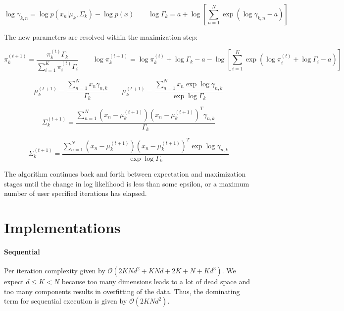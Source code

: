 \documentclass{article}
\newcommand{\boundedBy}[1]{\mathcal{O} \left ( #1 \right )}
\begin{document}
\begin{equation}
	\log \gamma_{k, n} =  \log p \left ( x_n \lvert \mu_k, \Sigma_k \right )  - \log p(x) \qquad \log \Gamma_k = a + \log \left [ \sum_{n=1}^{N} \exp{ \left( \log \gamma_{k, n} - a \right )} \right ]
\end{equation}

The new parameters are resolved within the maximization step:

\begin{equation}
	\pi_{k}^{(t+1)} = \frac{ \pi_{k}^{(t)} \Gamma_k }{ \sum_{i=1}^{K} \pi_{i}^{(t)} \Gamma_i }
	\qquad
	\log \pi_{k}^{(t+1)} = \log \pi_{k}^{(t)} + \log \Gamma_k - a - \log \left [ \sum_{i=1}^{K} \exp{ \left( \log \pi_{i}^{(t)} + \log \Gamma_i - a \right )} \right ]
\end{equation}

\begin{equation}
	\mu_k^{(t+1)} = \frac{ \sum_{n=1}^{N} x_n \gamma_{n, k} }{ \Gamma_k  }
	\qquad
	\mu_k^{(t+1)} = \frac{ \sum_{n=1}^{N} x_n \exp{ \log \gamma_{n, k} } }{ \exp{ \log \Gamma_k }  }
\end{equation}

\begin{equation}
	\Sigma_k^{(t+1)} = \frac{ \sum_{n=1}^{N} (x_n - \mu_k^{(t+1)}) (x_n - \mu_k^{(t+1)})^T \gamma_{n, k} }{ \Gamma_k  }
\end{equation}

\begin{equation}
	\Sigma_k^{(t+1)} = \frac{ \sum_{n=1}^{N} (x_n - \mu_k^{(t+1)}) (x_n - \mu_k^{(t+1)})^T \exp \log \gamma_{n, k} }{ \exp \log \Gamma_k  }
\end{equation}

The algorithm continues back and forth between expectation and maximization stages until the change in log likelihood is less than some epsilon, or a maximum number of user specified iterations has elapsed.

\section{Implementations}

\paragraph{Sequential} Per iteration complexity given by $\boundedBy{2 K N d^2 + K N d + 2K + N + K d^3}$. We expect $d \le K < N$ because too many dimensions leads to a lot of dead space and too many components results in overfitting of the data. Thus, the dominating term for sequential execution is given by $\boundedBy{ 2 K N d^2 }$. 
\end{document}
